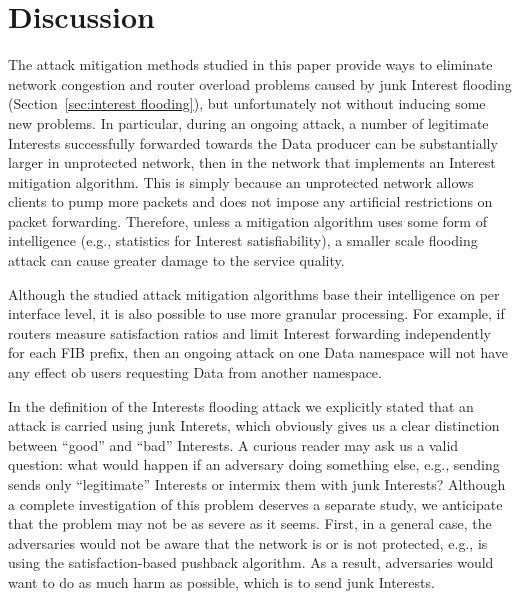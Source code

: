 \section{Discussion}
\label{sec:discussion}


The attack mitigation methods studied in this paper provide ways to eliminate network congestion and router overload problems caused by junk Interest flooding (Section~\ref{sec:interest flooding}), but unfortunately not without inducing some new problems.
In particular, during an ongoing attack, a number of legitimate Interests successfully forwarded towards the Data producer can be substantially larger in unprotected network, then in the network that implements an Interest mitigation algorithm.  
This is simply because an unprotected network allows clients to pump more packets and does not impose any artificial restrictions on packet forwarding.
Therefore, unless a mitigation algorithm uses some form of intelligence (e.g., statistics for Interest satisfiability), a smaller scale flooding attack can cause greater damage to the service quality.

Although the studied attack mitigation algorithms base their intelligence on per interface level, it is also possible to use more granular processing.
For example, if routers measure satisfaction ratios and limit Interest forwarding independently for each FIB prefix, then an ongoing attack on one Data namespace will not have any effect ob users requesting Data from another namespace.


In the definition of the Interests flooding attack we explicitly stated that an attack is carried using junk Interets, which obviously gives us a clear distinction between ``good'' and ``bad'' Interests.
A curious reader may ask us a valid question: what would happen if an adversary doing something else, e.g., sending sends only ``legitimate'' Interests or intermix them with junk Interests?
Although a complete investigation of this problem deserves a separate study, we anticipate that the problem may not be as severe as it seems.
First, in a general case, the adversaries would not be aware that the network is or is not protected, e.g., is using the satisfaction-based pushback algorithm.
As a result, adversaries would want to do as much harm as possible, which is to send junk Interests.


